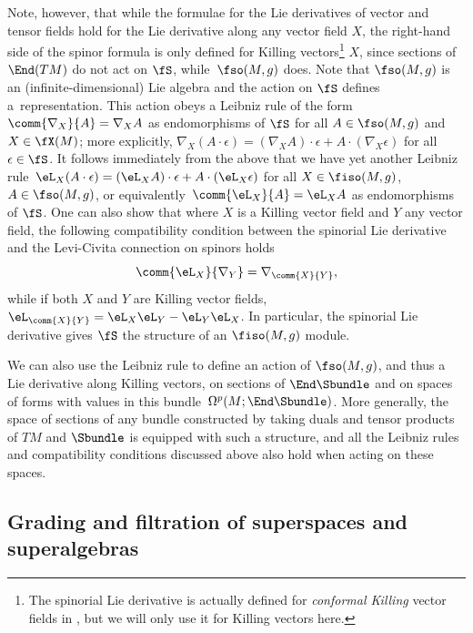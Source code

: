 Note, however, that while the formulae for the Lie derivatives of vector and tensor fields hold for the Lie derivative along any vector field $X$, the right-hand side of the spinor formula is only defined for Killing vectors\footnote{The spinorial Lie derivative is actually defined for \emph{conformal Killing} vector fields in \cite{Kosmann1971}, but we will only use it for Killing vectors here.}
$X$, since sections of $\End(TM)$ do not act on $\fS$, while~$\fso(M,g)$ does. Note that $\fso(M,g)$ is an (infinite-dimensional) Lie algebra and the action on $\fS$ defines a~representation. This action obeys a Leibniz rule of the form $\comm{\nabla_X}{A}=\nabla_X A$ as endomorphisms of $\fS$ for all $A\in\fso(M,g)$ and $X\in\fX(M)$; more explicitly,
$\nabla_X (A\cdot\epsilon) = (\nabla_X A)\cdot\epsilon + A\cdot(\nabla_X \epsilon)
$
for all $\epsilon\in\fS$. It follows immediately from the above that we have yet another Leibniz rule~${\eL_X (A\cdot\epsilon) = (\eL_X A)\cdot\epsilon + A\cdot(\eL_X \epsilon)
}$
for all $X\in\fiso(M,g)$, $A\in\fso(M,g)$, or equivalently~${\comm{\eL_X}{A}=\eL_X A}$ as endomorphisms of $\fS$. One can also show that where $X$ is a Killing vector field and $Y$ any vector field, the following compatibility condition between the spinorial Lie derivative and the Levi-Civita connection on spinors holds
\begin{equation}\label{eq:lie-der-compat}
	\comm{\eL_X}{\nabla_Y} = \nabla_{\comm{X}{Y}},
\end{equation}
while if both $X$ and $Y$ are Killing vector fields,
$\eL_{\comm{X}{Y}} = \eL_X\eL_Y - \eL_Y\eL_X$.
In particular, the spinorial Lie derivative gives $\fS$ the structure of an $\fiso(M,g)$ module.

We can also use the Leibniz rule to define an action of $\fso(M,g)$, and thus a Lie derivative along Killing vectors, on sections of $\End\Sbundle$ and on spaces of forms with values in this bundle~$\Omega^p(M;\End\Sbundle)$. More generally, the space of sections of any bundle constructed by taking duals and tensor products of $TM$ and $\Sbundle$ is equipped with such a structure, and all the Leibniz rules and compatibility conditions discussed above also hold when acting on these spaces.


\subsection{Grading and filtration of superspaces and superalgebras}
\label{sec:grading-filtration-superspace}

